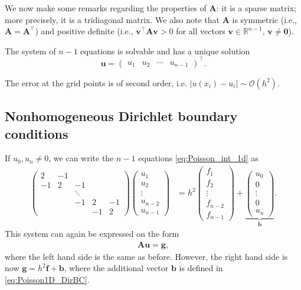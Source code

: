 We now make some remarks regarding the properties of $\bm A$:
it is a sparse matrix;  more precisely, it is a tridiagonal matrix.
We also note that $\bm A$ is symmetric (i.e., $\bm A = \bm A^\intercal$) and
positive definite (i.e., $\bm v^\intercal \bm A \bm v > 0$ for all vectors $\bm
v \in \mathbb{R}^{n-1}$, $\bm v \not= \bm 0$).

The system of $n-1$ equations is solvable and has a unique solution
\[
  \bm u = \begin{pmatrix} u_1 & u_2 & \cdots & u_{n-1} \end{pmatrix}^\intercal.
\]

The error at the grid points is of second order, i.e.
$|u(x_i)-u_i| \sim \mathcal{O}(h^2)$.

\subsection{Nonhomogeneous Dirichlet boundary conditions}

If $u_0, u_{n} \not= 0$, we can write the $n-1$ equations
\eqref{eq:Poisson_int_1d} as
\begin{align}
  \begin{pmatrix}
    2 & -1 & & & \\
    -1 & 2 & -1 & & \\
    & & \ddots & & \\
    & & -1 & 2 & -1 \\
    & & & -1 & 2
  \end{pmatrix}
  \begin{pmatrix}
    u_1 \\
    u_2 \\
    \vdots \\
    u_{n-2} \\
    u_{n-1}
  \end{pmatrix}
  &= h^2
  \begin{pmatrix}
    f_1 \\
    f_2 \\
    \vdots \\
    f_{n-2} \\
    f_{n-1}
  \end{pmatrix}
  +
  \underbrace{ \begin{pmatrix}
    u_0 \\
    0 \\
    \vdots \\
    0 \\
    u_{n}
  \end{pmatrix}
  }_{\bm b}.
  \label{eq:Poisson1D_DirBC}
\end{align}
This system can again be expressed on the form
\begin{align*}
  \bm A \bm u = \bm g,
\end{align*}
where the left hand side is the same as before. However, the right hand side is
now $\bm g = h^2 \bm f + \bm b$, where the additional vector $\bm b$ is defined
in \eqref{eq:Poisson1D_DirBC}.

